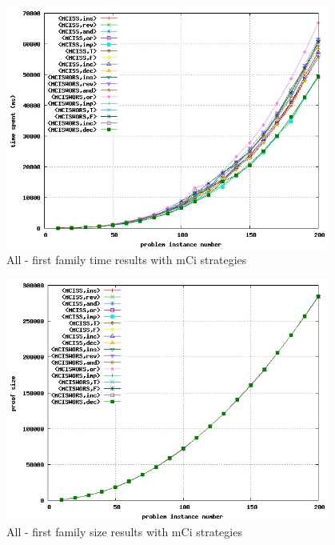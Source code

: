 \documentclass[a4paper,10pt]{book}
\newcommand{\mci}{mCi}
\begin{document}
\begin{figure}[!htbp]
\begin{center}
\includegraphics[width=0.95\textwidth]{../mci_1_a.jpg}
\end{center}
\caption{All - first family time results with \mci\/ strategies}
\end{figure}

\begin{figure}[!htbp]
\begin{center}
\includegraphics[width=0.95\textwidth]{../mci_1_b.jpg}
\end{center}
\caption{All - first family size results with \mci\/ strategies}
\end{figure}
\end{document}
